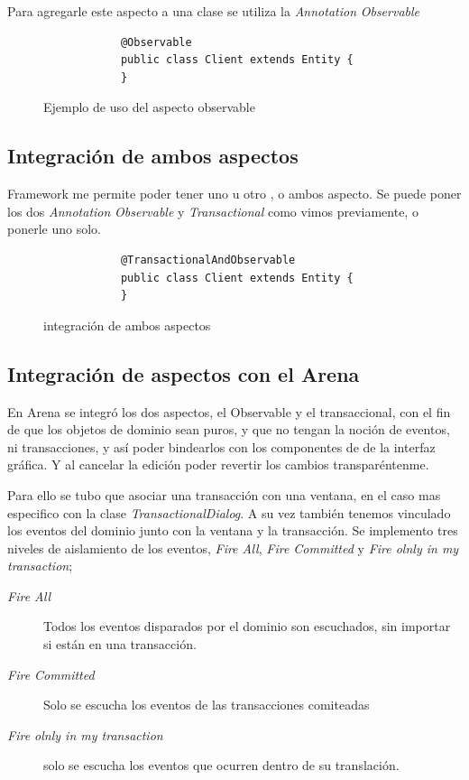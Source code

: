 		Para agregarle este aspecto a una clase se utiliza la \emph{Annotation}
		\emph{Observable}
		
	\begin{figure}[h]
		\begin{lstlisting} 
			@Observable
			public class Client extends Entity {
			}
		\end{lstlisting}
		\caption{Ejemplo de uso del aspecto observable}
		\label{poo}
	\end{figure}  
		


\subsection{Integración de ambos aspectos } 
	Framework me permite poder tener uno u otro , o
	ambos aspecto. Se puede poner los dos \emph{Annotation} \emph{Observable} y
	\emph{Transactional} como vimos previamente, o ponerle uno solo. 
	
	\begin{figure}[h]
		\begin{lstlisting} 
			@TransactionalAndObservable
			public class Client extends Entity {
			}
		\end{lstlisting}
		\caption{integración de ambos aspectos}
		\label{TandO}
	\end{figure}  
	
	
	
\subsection{Integración de aspectos con el Arena}
	En Arena se integró los dos aspectos, el Observable y el transaccional, con el
	fin de que los objetos de dominio sean puros, y que no tengan la noción de
	eventos, ni transacciones, y así poder bindearlos con los componentes de de la
	interfaz gráfica. Y al cancelar la edición poder revertir los cambios
	transparéntenme.
	
	Para ello se tubo que asociar una transacción con una ventana, en el caso mas
	especifico con la clase \emph{TransactionalDialog}. A su vez también tenemos
	vinculado los eventos del dominio junto con la ventana y la transacción.
	Se implemento tres niveles de aislamiento de los eventos,  \emph{Fire All},
	\emph{Fire Committed} y \emph{Fire olnly in my transaction};
	
	\begin{description}
		\item[\emph{Fire All}] Todos los eventos disparados por el dominio son
		escuchados, sin importar si están en una transacción.
	
		\item[\emph{Fire Committed}] Solo se escucha los eventos de las transacciones
			comiteadas
		
		\item[\emph{Fire olnly in my transaction}] solo se escucha los eventos que
			ocurren dentro de su translación.
	
	 \end{description}
	 
